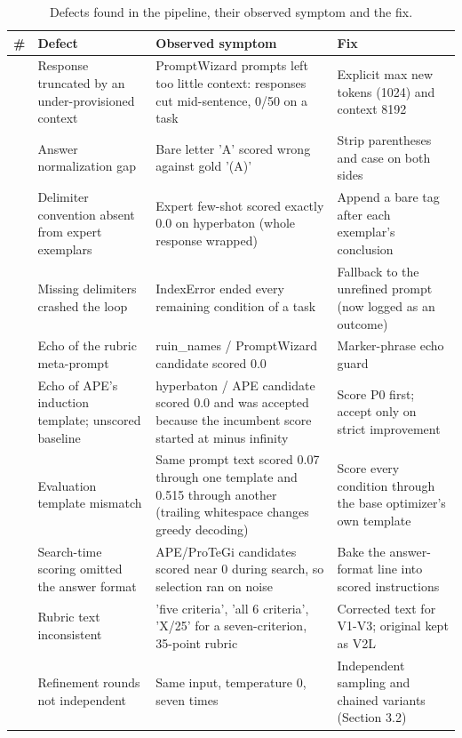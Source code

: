 \documentclass{ieeeaccess}
\begin{document}
\begin{table}[htbp]
\centering
\footnotesize
\caption{Defects found in the pipeline, their observed symptom and the fix.}
\begin{tabular}{>{\raggedright\arraybackslash}p{}>{\raggedright\arraybackslash}p{}>{\raggedright\arraybackslash}p{}>{\raggedright\arraybackslash}p{}}
\toprule
\textbf{\#} & \textbf{Defect} & \textbf{Observed symptom} & \textbf{Fix} \\
\midrule
1 & Response truncated by an under-provisioned context & PromptWizard prompts left too little context: responses cut mid-sentence, 0/50 on a task & Explicit max new tokens (1024) and context 8192 \\
2 & Answer normalization gap & Bare letter 'A' scored wrong against gold '(A)' & Strip parentheses and case on both sides \\
3 & Delimiter convention absent from expert exemplars & Expert few-shot scored exactly 0.0 on hyperbaton (whole response wrapped) & Append a bare tag after each exemplar's conclusion \\
4 & Missing delimiters crashed the loop & IndexError ended every remaining condition of a task & Fallback to the unrefined prompt (now logged as an outcome) \\
5 & Echo of the rubric meta-prompt & ruin\_\allowbreak{}names / PromptWizard candidate scored 0.0 & Marker-phrase echo guard \\
6 & Echo of APE's induction template; unscored baseline & hyperbaton / APE candidate scored 0.0 and was accepted because the incumbent score started at minus infinity & Score P0 first; accept only on strict improvement \\
7 & Evaluation template mismatch & Same prompt text scored 0.07 through one template and 0.515 through another (trailing whitespace changes greedy decoding) & Score every condition through the base optimizer's own template \\
8 & Search-time scoring omitted the answer format & APE/ProTeGi candidates scored near 0 during search, so selection ran on noise & Bake the answer-format line into scored instructions \\
9 & Rubric text inconsistent & 'five criteria', 'all 6 criteria', 'X/25' for a seven-criterion, 35-point rubric & Corrected text for V1-V3; original kept as V2L \\
10 & Refinement rounds not independent & Same input, temperature 0, seven times & Independent sampling and chained variants (Section 3.2) \\

\end{tabular}
\end{table}
\end{document}
